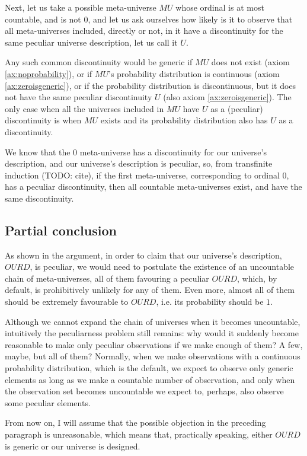 \documentclass[a4paper
,draft
]{article}
\def\our_description{OURD}
\begin{document}
Next, let us take a possible meta-universe $MU$ whose ordinal is at most
countable, and is not $0$, and let us
ask ourselves how likely is it to observe that all meta-universes
included, directly or not, in it have a discontinuity for
the same peculiar universe description, let us call it $U$.

Any such common discontinuity would be generic if $MU$ does not exist
(axiom \ref{ax:noprobability}), or if $MU$'s probability distribution
is continuous (axiom \ref{ax:zeroisgeneric}),
or if the probability distribution is discontinuous,
but it does not have the same peculiar discontinuity $U$
(also axiom \ref{ax:zeroisgeneric}).
The only case when all the universes included in $MU$ have $U$ as a
(peculiar) discontinuity is when $MU$ exists and its probability distribution
also has $U$ as a discontinuity.

We know that the $0$ meta-universe has a discontinuity for
our universe's description, and our universe's description is peculiar, so,
from transfinite induction (TODO: cite), if the first meta-universe,
corresponding to ordinal $0$, has a peculiar discontinuity, then all countable
meta-universes exist, and have the same discontinuity.

\subsection{Partial conclusion}

As shown in the argument, in order to claim that our universe's description,
$\our_description$, is peculiar,
we would need to postulate the
existence of an uncountable chain of meta-universes, all of them favouring a
peculiar $\our_description$, which, by default,
is prohibitively unlikely for any of them. Even more, almost all of them
should be extremely favourable to $\our_description$, i.e. its probability
should be $1$.

Although we cannot expand the chain of universes when it becomes uncountable,
intuitively the peculiarness problem
still remains: why would it suddenly become reasonable to make
only peculiar observations if we make enough of them? A few, maybe, but all
of them? Normally, when we make
observations with a continuous probability distribution, which is the default,
we expect to observe only generic elements as long as we make a
countable number of observation, and only when the observation set
becomes uncountable we expect to, perhaps, also observe some peculiar elements.

From now on, I will assume that the possible objection in the preceding
paragraph is unreasonable, which means that, practically speaking,
either $\our_description$ is generic or our universe is designed.
\end{document}
